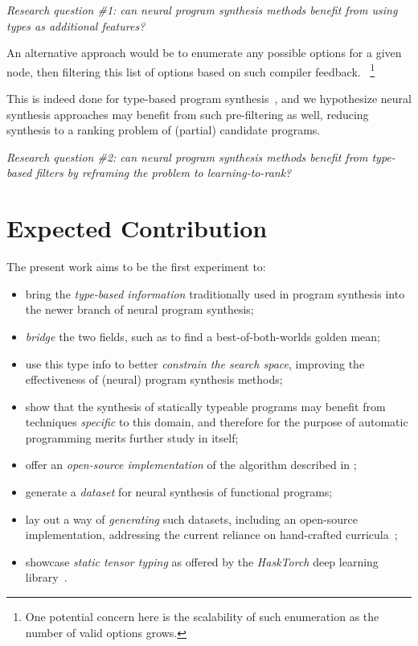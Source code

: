 \documentclass{article}
\begin{document}
\begin{displayquote} %
    \emph{Research question \#1: can neural program synthesis methods benefit from using types as additional features?}
\end{displayquote}

An alternative approach would be to enumerate any possible options for a given node,
then filtering this list of options based on such compiler feedback.%
~\footnote{One potential concern here is the scalability of such enumeration as the number of valid options grows.}

This is indeed done for type-based program synthesis~\citep{myth},
and we hypothesize neural synthesis approaches may benefit from such pre-filtering as well,
reducing synthesis to a ranking problem of (partial) candidate programs.

\begin{displayquote} \label{hyp:filter}
    \emph{Research question \#2: can neural program synthesis methods benefit from type-based filters by reframing the problem to learning-to-rank?}
\end{displayquote}


\section{Expected Contribution} %

The present work aims to be the first experiment to:
\begin{itemize}
    \item bring the \emph{type-based information} traditionally used in program synthesis into the newer branch of neural program synthesis;
    \item \emph{bridge} the two fields, such as to find a best-of-both-worlds golden mean;
    \item use this type info to better \emph{constrain the search space}, improving the effectiveness of (neural) program synthesis methods;
    \item show that the synthesis of statically typeable programs may benefit from techniques \emph{specific} to this domain, and therefore for the purpose of automatic programming merits further study in itself;
    \item offer an \emph{open-source implementation} of the algorithm described in \citet{nsps};
    \item generate a \emph{dataset} for neural synthesis of functional programs;
    \item lay out a way of \emph{generating} such datasets, including an open-source implementation, addressing the current reliance on hand-crafted curricula~\citep{nps};
    \item showcase \emph{static tensor typing} as offered by the \emph{HaskTorch} deep learning library~\citep{hasktorch}.
\end{itemize}
\end{document}
